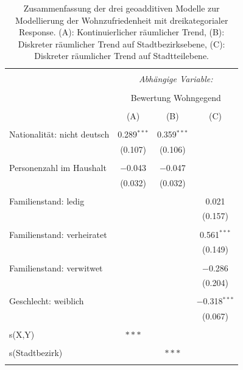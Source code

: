 \documentclass{Vorlage}
\begin{document}
\begin{appendix}
\begin{table}[h] \centering 
  \caption{Zusammenfassung der drei geoadditiven Modelle zur Modellierung der Wohnzufriedenheit mit dreikategorialer Response. (A): Kontinuierlicher räumlicher Trend, (B): Diskreter räumlicher Trend auf Stadtbezirksebene, (C): Diskreter räumlicher Trend auf Stadtteilebene.} 
  \label{ParameterTabW5spat} 
\begin{tabular}{@{\extracolsep{5pt}}lccc} 
\\[-1.8ex]\hline 
\hline \\[-1.8ex] 
 & \multicolumn{3}{c}{\textit{Abhängige Variable:}} \\ 
\cline{2-4} 
\\[-1.8ex] & \multicolumn{3}{c}{Bewertung Wohngegend} \\ 
\\[-1.8ex] & (A) & (B) & (C)\\ 
\hline \\[-1.8ex] 
 Nationalität: nicht deutsch & 0.289$^{***}$ & 0.359$^{***}$ &  \\ 
  & (0.107) & (0.106) &  \\ 
  & & & \\ 
 Personenzahl im Haushalt & $-$0.043 & $-$0.047 &  \\ 
  & (0.032) & (0.032) &  \\ 
  & & & \\ 
 Familienstand: ledig &  &  & 0.021 \\ 
  &  &  & (0.157) \\ 
  & & & \\ 
 Familienstand: verheiratet &  &  & 0.561$^{***}$ \\ 
  &  &  & (0.149) \\ 
  & & & \\ 
 Familienstand: verwitwet &  &  & $-$0.286 \\ 
  &  &  & (0.204) \\ 
  & & & \\ 
 Geschlecht: weiblich &  &  & $-$0.318$^{***}$ \\ 
  &  &  & (0.067) \\ \hline
   & & & \\ 
 s(X,Y) & $***$ &  &  \\ 
  & & & \\ 
 s(Stadtbezirk)&  & $***$ &  \\ 
  & & & \\ 

\end{tabular}
\end{table}
\end{appendix}
\end{document}
